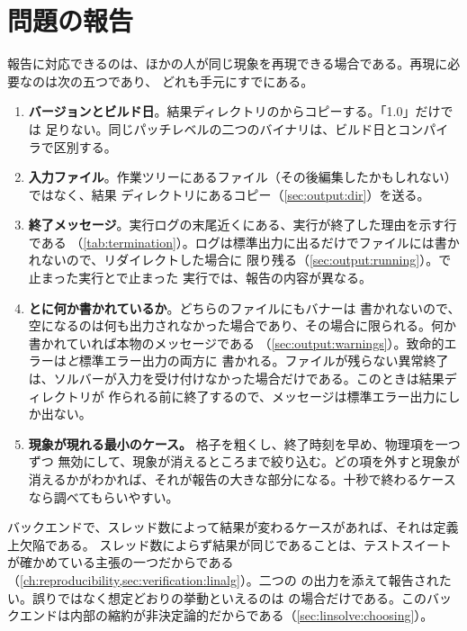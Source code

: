 \section{問題の報告}
\label{sec:policy:reporting}

報告に対応できるのは、ほかの人が同じ現象を再現できる場合である。再現に必要なのは次の五つであり、
どれも手元にすでにある。

\begin{enumerate}
  \item \textbf{バージョンとビルド日}。結果ディレクトリのからコピーする。「1.0」だけでは
    足りない。同じパッチレベルの二つのバイナリは、ビルド日とコンパイラで区別する。
  \item \textbf{入力ファイル}。作業ツリーにあるファイル（その後編集したかもしれない）ではなく、結果
    ディレクトリにあるコピー（\cref{sec:output:dir}）を送る。
  \item \textbf{終了メッセージ}。実行ログの末尾近くにある、実行が終了した理由を示す行である
    （\cref{tab:termination}）。ログは標準出力に出るだけでファイルには書かれないので、リダイレクトした場合に
    限り残る（\cref{sec:output:running}）。で止まった実行とで止まった
    実行では、報告の内容が異なる。
  \item \textbf{とに何か書かれているか}。どちらのファイルにもバナーは
    書かれないので、空になるのは何も出力されなかった場合であり、その場合に限られる。何か書かれていれば本物のメッセージである
    （\cref{sec:output:warnings}）。致命的エラーは\emph{と}標準エラー出力の両方に
    書かれる。ファイルが残らない異常終了は、ソルバーが入力を受け付けなかった場合だけである。このときは結果ディレクトリが
    作られる前に終了するので、メッセージは標準エラー出力にしか出ない。
  \item \textbf{現象が現れる最小のケース。} 格子を粗くし、終了時刻を早め、物理項を一つずつ
    無効にして、現象が消えるところまで絞り込む。どの項を外すと現象が消えるかがわかれば、それが報告の大きな部分になる。十秒で終わるケースなら調べてもらいやすい。
\end{enumerate}

\begin{note}[スレッド数による差は常にバグである]
  バックエンドで、スレッド数によって結果が変わるケースがあれば、それは定義上欠陥である。
  スレッド数によらず結果が同じであることは、テストスイートが確かめている主張の一つだからである
  （\cref{ch:reproducibility,sec:verification:linalg}）。二つの
  の出力を添えて報告されたい。誤りではなく想定どおりの挙動といえるのは
  の場合だけである。このバックエンドは内部の縮約が非決定論的だからである（\cref{sec:linsolve:choosing}）。
\end{note}
